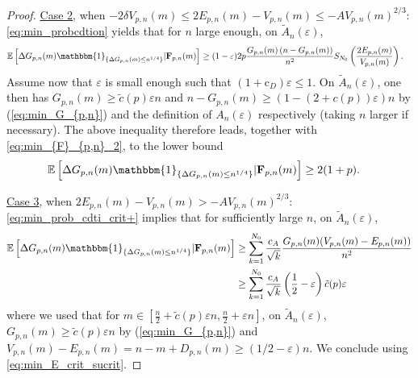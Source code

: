 \documentclass[a4, 11pt]{article}
\numberwithin{equation}{section}
\theoremstyle{plain}
\theoremstyle{definition}
\theoremstyle{remark}
\begin{document}
\begin{proof}
{\underline{Case 2}, when} $-2\delta V_{p,n}(m)\leq 2E_{p,n}(m)-V_{p,n}(m)\leq -AV_{p,n}(m)^{2/3}$: \eqref{eq:min_probcdtion} yields that for $n$ large enough, on $\tilde{A}_n(\varepsilon)$,  
		\begin{align*}
			\mathbb{E}\left[\Delta G_{p,n}(m)\mathbbm{1}_{\{\Delta G_{p,n}(m)\leq n^{1/4}\}}| \mathbf{F}_{p,n}(m)\right] &\geq (1-\varepsilon) 2p\frac{G_{p,n}(m)\left(n-G_{p,n}(m)\right)}{n^2}S_{N_0}\left(\frac{2E_{p,n}(m)}{V_{p,n}(m)}\right).
		\end{align*}
Assume now that $\varepsilon$ is small enough such that $(1+\mathrm c_D)\varepsilon \leq 1$. On $ \tilde{A}_n(\varepsilon)$, one then has $G_{p,n}(m)\geq \tilde{c}(p)\varepsilon n$	and $n-G_{p,n}(m)\geq \left(1-(2+c(p))\varepsilon\right)n$ by (\ref{eq:min_G_{p,n}}) and the definition of $A_n(\varepsilon)$ respectively (taking $n$ larger if necessary). The above inequality therefore leads, together with \eqref{eq:min_{F}_{p,n}_2}, to the lower bound
	\begin{align*}
	\mathbb{E}\left[\Delta G_{p,n}(m)\mathbbm{1}_{\{\Delta G_{p,n}(m)\leq n^{1/4}\}}| \mathbf{F}_{p,n}(m)\right]
	&\geq 2(1+p).
	\end{align*}
	

{\underline{Case 3}, when} $ 2E_{p,n}(m)-V_{p,n}(m) > -AV_{p,n}(m)^{2/3}$: \eqref{eq:min_prob_cdti_crit+} implies that for sufficiently large $n$, on $\tilde{A}_n(\varepsilon)$,
		\begin{align*}
			\mathbb{E}\left[\Delta G_{p,n}(m)\mathbbm{1}_{\{\Delta G_{p,n}(m)\leq n^{1/4}\}}| \mathbf{F}_{p,n}(m)\right] &\geq \sum_{k=1}^{N_0}\frac{c_A}{\sqrt{k}}\frac{G_{p,n}(m)(V_{p,n}(m)-E_{p,n}(m))}{n^2}	\\
			&\geq \sum_{k=1}^{N_0}\frac{c_A}{\sqrt{k}}\left(\frac{1}{2}-\varepsilon\right)\tilde{c}(p)\varepsilon
		\end{align*}
	where we used that for $m\in \left[\frac{n}{2}+\tilde{c}(p)\varepsilon n,\frac{n}{2}+\varepsilon n\right]$, on $\tilde{A}_n(\varepsilon)$, $G_{p,n}(m)\geq \tilde{c}(p)\varepsilon n$ by (\ref{eq:min_G_{p,n}}) and $V_{p,n}(m)-E_{p,n}(m)=n-m+D_{p,n}(m)\geq \left(1/2-\varepsilon\right)n$. We conclude using \eqref{eq:min_E_crit_sucrit}.
\end{proof}
\end{document}

